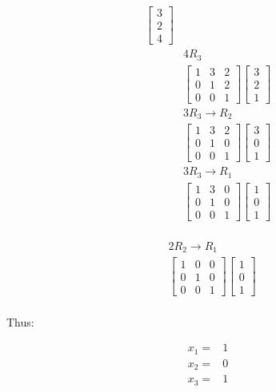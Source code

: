 \documentclass[11pt]{article}
\begin{document}
\begin{flushleft}
\begin{align*}
\begin{bmatrix}
3 \\ 2 \\ 4
\end{bmatrix}\\
&4R_3 \\
&\begin{bmatrix}
1 & 3 & 2 \\
0 & 1 & 2 \\
0 & 0 & 1
\end{bmatrix}
\begin{bmatrix}
3 \\ 2 \\ 1
\end{bmatrix}\\
&3R_3 \rightarrow R_2 \\
&\begin{bmatrix}
1 & 3 & 2 \\
0 & 1 & 0 \\
0 & 0 & 1
\end{bmatrix}
\begin{bmatrix}
3 \\ 0 \\ 1
\end{bmatrix}\\
&3R_3 \rightarrow R_1 \\
&\begin{bmatrix}
1 & 3 & 0 \\
0 & 1 & 0 \\
0 & 0 & 1
\end{bmatrix}
\begin{bmatrix}
1 \\ 0 \\ 1
\end{bmatrix}\\
\end{align*}

\begin{align*}
&2R_2 \rightarrow R_1 \\
&\begin{bmatrix}
1 & 0 & 0 \\
0 & 1 & 0 \\
0 & 0 & 1
\end{bmatrix}
\begin{bmatrix}
1 \\ 0 \\ 1
\end{bmatrix}\\
\end{align*}

Thus:

\begin{align*}
x_1 =& 1 \\
x_2 =& 0 \\
x_3 =& 1
\end{align*}

\end{flushleft}
\end{document}

